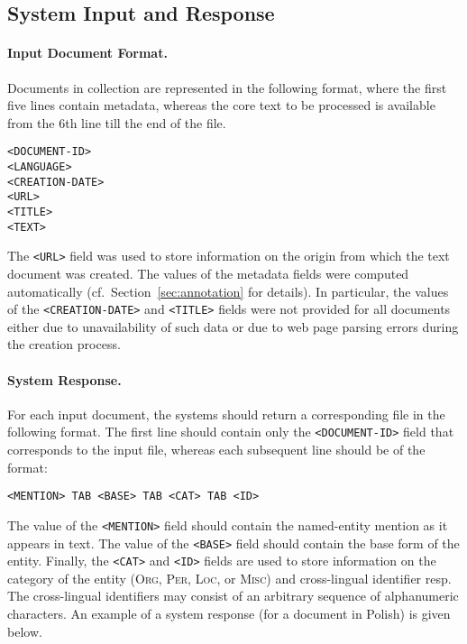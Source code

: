 \documentclass[11pt]{article}
\begin{document}
\subsection{System Input and Response}
\label{sec:protocol}

\paragraph{Input Document Format.}
\label{subsec:input}
%
Documents in collection are represented in the following
format, where the first five lines contain metadata, whereas the core text
to be processed is available from the 6th line till the end of the file.

\begin{small}
\begin{verbatim}
<DOCUMENT-ID>
<LANGUAGE>
<CREATION-DATE>
<URL>
<TITLE>
<TEXT>
\end{verbatim}
\end{small}

\noindent The \verb+<URL>+ field was used to store information on the origin from which 
the text document was created. The values of the metadata fields were computed automatically 
(cf.~Section~\ref{sec:annotation} for details). In particular, the values of the \verb+<CREATION-DATE>+ 
and \verb+<TITLE>+ fields were not provided for all documents either due to unavailability 
of such data or due to web page parsing errors during the creation process. 

\paragraph{System Response.}
\label{subsec:input}
%
For each input document, the systems should return a corresponding file in the following format.
The first line should contain only the \verb+<DOCUMENT-ID>+ field that corresponds to the input file,
whereas each subsequent line should be of the format:

\begin{small}
\begin{verbatim}
<MENTION> TAB <BASE> TAB <CAT> TAB <ID>
\end{verbatim}
\end{small}

\noindent The value of the \verb+<MENTION>+ field should contain the
named-entity mention as it appears in text. The value of the \verb+<BASE>+
field should contain the base form of the entity. Finally, the \verb+<CAT>+ and
\verb+<ID>+ fields are used to store information on the category of the entity
(\textsc{Org}, \textsc{Per}, \textsc{Loc}, or \textsc{Misc}) and cross-lingual
identifier resp.  The cross-lingual identifiers may consist of an arbitrary
sequence of alphanumeric characters.  An example of a system response (for a
document in Polish) is given below.
\end{document}

